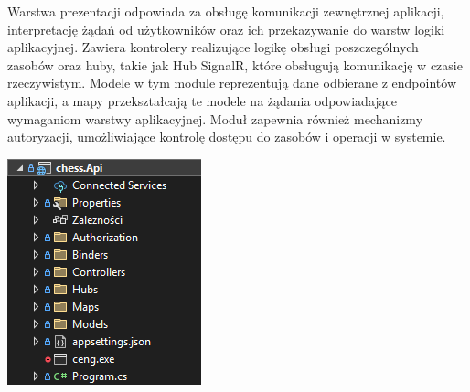 \documentclass[12pt,a4paper]{article}
\begin{document}
\vspace{0.5cm}
\begin{minipage}[t]{0.45\textwidth}
    \vspace{0pt}
    \justifying 
    \noindent
    Warstwa prezentacji odpowiada za obsługę komunikacji zewnętrznej aplikacji, interpretację żądań od użytkowników oraz ich przekazywanie do warstw logiki aplikacyjnej. Zawiera kontrolery realizujące logikę obsługi poszczególnych zasobów oraz huby, takie jak Hub SignalR, które obsługują komunikację w czasie rzeczywistym. Modele w tym module reprezentują dane odbierane z endpointów aplikacji, a mapy przekształcają te modele na żądania odpowiadające wymaganiom warstwy aplikacyjnej. Moduł zapewnia również mechanizmy autoryzacji, umożliwiające kontrolę dostępu do zasobów i operacji w systemie.
\end{minipage}
\hfill
\begin{minipage}[t]{0.45\textwidth}
    \vspace{0pt}
    \centering
    \includegraphics[width=\linewidth]{images/struktura_back_api.png}
\end{minipage}
\vspace{0.5cm}
\end{document}
